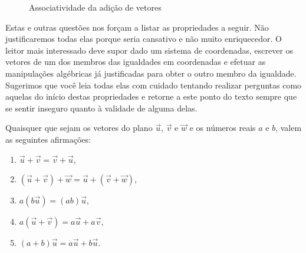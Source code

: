 \begin{figure}[H]\centering{}\caption{Associatividade da adição de vetores}\end{figure}
Estas e outras questões nos forçam a listar as propriedades a seguir.
Não justificaremos todas elas porque seria cansativo e não muito enriquecedor.
O leitor mais interessado deve supor dado um sistema de coordenadas, escrever os vetores de um dos membros das igualdades em coordenadas e efetuar as manipulações algébricas já justificadas para obter o outro membro da igualdade.
Sugerimos que você leia todas elas com cuidado tentando realizar perguntas como aquelas do início destas propriedades e retorne a este ponto do texto sempre que se sentir inseguro quanto à validade de alguma delas.

Quaisquer que sejam os vetores do plano \(\vec{u}\), \(\vec{v}\) e \(\vec{w}\) e os números reais \(a\) e \(b\), valem as seguintes afirmações:
\begin{enumerate}
\item {} 
\(\vec{u} + \vec{v} = \vec{v} + \vec{u}\),

\item {} 
\((\vec{u} + \vec{v}) + \vec{w} = \vec{u} + (\vec{v} + \vec{w})\),

\item {} 
\(a(b\vec{u})=(ab)\vec{u}\),

\item {} 
\(a(\vec{u}+\vec{v})= a\vec{u} +a \vec{v}\),

\item {} 
\((a+b)\vec{u} = a\vec{u} + b\vec{u}\).

\end{enumerate}

